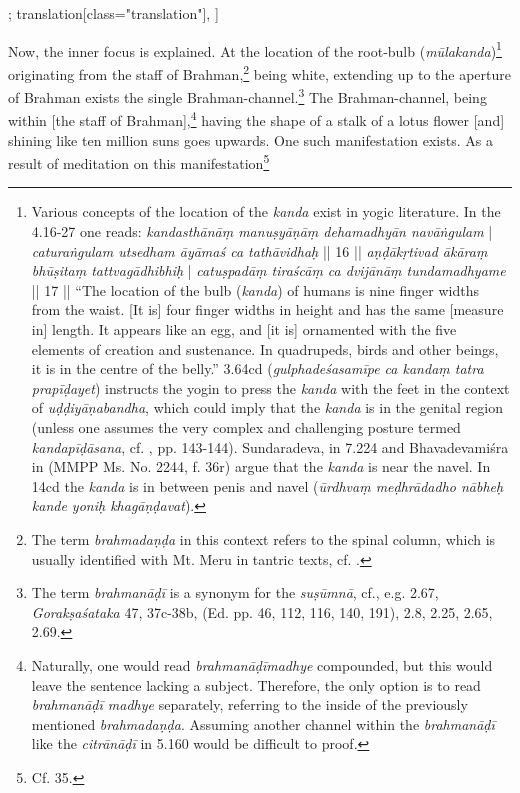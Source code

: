 \begin{alignment}[
  texts=edition[class="edition"];
  translation[class="translation"],
  ]
\begin{translation}
\begin{tlate}[p24_01]
Now, the inner focus is explained. At the location of the root-bulb (\textit{mūlakanda})\footnote{Various concepts of the location of the \textit{kanda} exist in yogic literature. In the  4.16-27 one reads: \textit{kandasthānāṃ manuṣyāṇāṃ dehamadhyān navāṅgulam} | \textit{caturaṅgulam utsedham āyāmaś ca tathāvidhaḥ} || 16 || \textit{aṇḍākṛtivad ākāraṃ bhūṣitaṃ tattvagādhibhiḥ} | \textit{catuṣpadāṃ tiraścāṃ ca dvijānāṃ tundamadhyame} || 17 || ``The location of the bulb (\textit{kanda}) of humans is nine finger widths from the waist. [It is] four finger widths in height and has the same [measure in] length. It appears like an egg, and [it is] ornamented with the five elements of creation and sustenance. In quadrupeds, birds and other beings, it is in the centre of the belly.''  3.64cd (\textit{gulphadeśasamīpe ca kandaṃ tatra prapīḍayet}) instructs the yogin to press the \emph{kanda} with the feet in the context of \textit{uḍḍiyāṇabandha}, which could imply that the \emph{kanda} is in the genital region (unless one assumes the very complex and challenging posture termed \textit{kandapīḍāsana}, cf. , pp. 143-144). Sundaradeva, in  7.224 and Bhavadevamiśra in  (MMPP Ms. No. 2244, f. 36r) argue that the \emph{kanda} is near the navel. In  14cd the \textit{kanda} is in between penis and navel (\textit{ūrdhvaṃ meḍhrādadho nābheḥ kande yoniḥ khagāṇḍavat}).} originating from the staff of Brahman,\footnote{The term \textit{brahmadaṇḍa} in this context refers to the spinal column, which is usually identified with Mt. Meru in tantric texts, cf. \citeauthor[1988: 360]{stupa}.} being white, extending up to the aperture of Brahman exists the single Brahman-channel.\footnote{The term \textit{brahmanāḍī} is a synonym for the \textit{suṣūmnā}, cf., e.g.  2.67, \emph{Gorakṣaśataka}\nocite{mallinson2012sataka} 47,  37c-38b,  (Ed. pp. 46, 112, 116, 140, 191),  2.8, 2.25, 2.65, 2.69.} The Brahman-channel, being within [the staff of Brahman],\footnote{Naturally, one would read \textit{brahmanāḍīmadhye} compounded, but this would leave the sentence lacking a subject. Therefore, the only option is to read \textit{brahmanāḍī madhye} separately, referring to the inside of the previously mentioned \textit{brahmadaṇḍa}. Assuming another channel within the \textit{brahmanāḍī} like the \textit{citrānāḍī} in  5.160 would be difficult to proof.} having the shape of a stalk of a lotus flower [and] shining like ten million suns goes upwards. One such manifestation exists. As a result of meditation on this manifestation\footnote{Cf.  35.} %
\end{tlate}
\end{translation}
\end{alignment}
